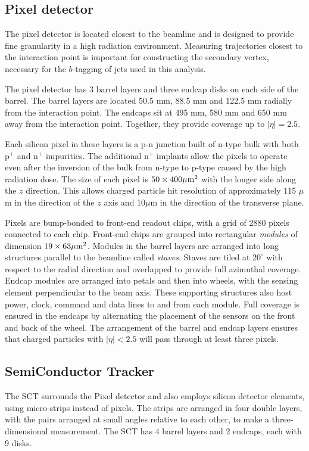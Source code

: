 \subsection{Pixel detector}
The pixel detector is located closest to the beamline and is designed to provide fine granularity in a high radiation environment. Measuring trajectories closest to the interaction point is important for constructing the secondary vertex, necessary for the $b$-tagging of jets used in this analysis.

The pixel detector has 3 barrel layers and three endcap disks on each side of the barrel. The barrel layers are located 50.5 mm, 88.5 mm and 122.5 mm radially from the interaction point. The endcaps sit at 495 mm, 580 mm and 650 mm away from the interaction point. Together, they provide coverage up to $|\eta|=2.5$.

Each silicon pixel in these layers is a p-n junction built of n-type bulk with both p$^+$ and n$^+$ impurities. The additional n$^+$ implants allow the pixels to operate even after the inversion of the bulk from n-type to p-type caused by the high radiation dose. The size of each pixel is $50 \times 400 \mu \textrm{m}^2$ with the longer side along the $z$ direction. This allows charged particle hit resolution of approximately 115 $\mu$m in the direction of the $z$ axis and 10$\mu$m in the direction of the transverse plane.

Pixels are bump-bonded to front-end readout chips, with a grid of 2880 pixels connected to each chip. Front-end chips are grouped into rectangular \emph{modules} of dimension $19 \times 63 \mu \textrm{m}^2$. Modules in the barrel layers are arranged into long structures parallel to the beamline called \emph{staves}. Staves are tiled at $20^{\circ}$ with respect to the radial direction and overlapped to provide full azimuthal coverage. Endcap modules are arranged into petals and then into wheels, with the sensing element perpendicular to the beam axis. These supporting structures also host power, clock, command and data lines to and from each module. Full coverage is ensured in the endcaps by alternating the placement of the sensors on the front and back of the wheel. The arrangement of the barrel and endcap layers ensures that charged particles with $|\eta|<2.5$ will pass through at least three pixels.

\subsection{SemiConductor Tracker}
The SCT surrounds the Pixel detector and also employs silicon detector elements, using micro-strips instead of pixels. The strips are arranged in four double layers, with the pairs arranged at small angles relative to each other, to make a three-dimensional measurement. The SCT has 4 barrel layers and 2 endcaps, each with 9 disks. 

